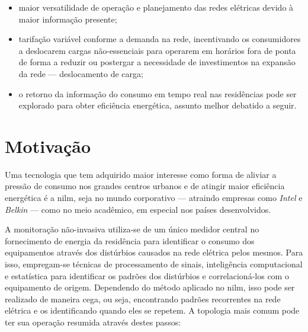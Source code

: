 \begin{itemize}
\item maior versatilidade de operação e planejamento das redes
elétricas devido à maior informação presente;
\item tarifação variável conforme a demanda na rede, incentivando os
consumidores a deslocarem cargas não-essenciais para operarem em
horários fora de ponta de forma a reduzir ou postergar a necessidade
de investimentos na expansão da rede --- deslocamento de carga;
\item o retorno da informação do consumo em tempo real nas residências pode ser
explorado para obter eficiência energética, assunto melhor
debatido a seguir.
\end{itemize}

\section{Motivação}

Uma tecnologia que tem adquirido maior interesse como forma de aliviar
a pressão de consumo nos grandes centros urbanos e de atingir maior
eficiência energética é a \gls{nilm}, seja no mundo corporativo --- atraindo
empresas como \emph{Intel} e \emph{Belkin} --- como no meio acadêmico,
em especial nos países desenvolvidos.

A monitoração não-invasiva utiliza-se de um único medidor central no
fornecimento de energia da residência para identificar o consumo dos
equipamentos através dos distúrbios causados na rede elétrica pelos
mesmos. Para isso, empregam-se técnicas de processamento
de sinais, inteligência computacional e estatística para identificar
os padrões dos distúrbios e correlacioná-los com o equipamento de origem.
Dependendo do método aplicado no \acs{nilm}, isso pode ser
realizado de maneira cega, ou seja, encontrando padrões recorrentes
na rede elétrica e os identificando quando eles se repetem.
A topologia mais comum pode ter sua operação resumida através destes
passos:

